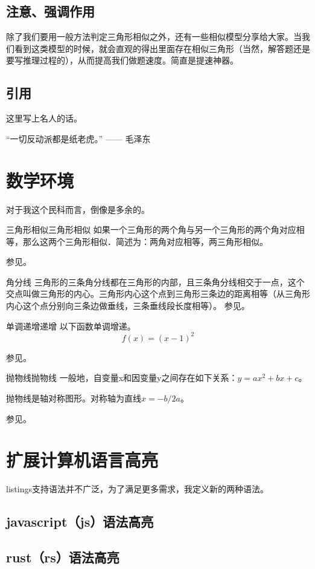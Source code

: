 \documentclass{morelull}
\begin{document}
\subsection{注意、强调作用}
\begin{注意}
除了我们要用一般方法判定三角形相似之外，还有一些相似模型分享给大家。当我们看到这类模型的时候，就会直观的得出里面存在相似三角形（当然，解答题还是要写推理过程的），从而提高我们做题速度。简直是提速神器。
\end{注意}

\subsection{引用}
\begin{引用}
    这里写上名人的话。

    “一切反动派都是纸老虎。” —— 毛泽东
\end{引用}

\section{数学环境}
对于我这个民科而言，倒像是多余的。

\begin{定理}{三角形相似}{三角形相似}
    如果一个三角形的两个角与另一个三角形的两个角对应相等，那么这两个三角形相似．简述为：两角对应相等，两三角形相似。

    参见。
\end{定理}

\begin{结论}{}{角分线}
    三角形的三条角分线都在三角形的内部，且三条角分线相交于一点，这个交点叫做三角形的内心。三角形内心这个点到三角形三条边的距离相等（从三角形内心这个点分别向三条边做垂线，三条垂线段长度相等）。
    参见。
\end{结论}

\begin{命题}{单调递增}{递增}
以下函数单调增递。
\[
    f(x) = (x - 1) ^ 2
\]

参见。
\end{命题}

\begin{定义}{抛物线}{抛物线}
    一般地，自变量x和因变量y之间存在如下关系：$y=ax^2+bx+c$。

    抛物线是轴对称图形。对称轴为直线$x=-b/2a$。

    参见。
\end{定义}

\section{扩展计算机语言高亮}
listings支持语法并不广泛，为了满足更多需求，我定义新的两种语法。

\subsection{javascript（js）语法高亮}


\subsection{rust（rs）语法高亮}

\end{document}
